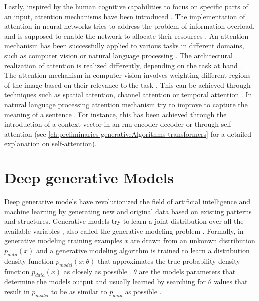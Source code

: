 Lastly, inspired by the human cognitive capabilities to focus on specific parts of an input, attention mechanisms have been introduced \cite{niu2021ReviewAttentionMechanism, aggarwal2018NeuralNetworksDeep}.
The implementation of attention in neural networks tries to address the problem of information overload, and is supposed to enable the network to allocate their resources \cite{niu2021ReviewAttentionMechanism}.
An attention mechanism has been successfully applied to various tasks in different domains, such as computer vision or natural language processing \cite{niu2021ReviewAttentionMechanism}.
The architectural realization of attention is realized differently, depending on the task at hand \cite{aggarwal2018NeuralNetworksDeep}.
The attention mechanism in computer vision involves weighting different regions of the image based on their relevance to the task \cite{aggarwal2018NeuralNetworksDeep}. 
This can be achieved through techniques such as spatial attention, channel attention or temporal attention \cite{guo2022AttentionMechanismsComputer}.
In natural language processing attention mechanism try to improve to capture the meaning of a sentence \cite{niu2021ReviewAttentionMechanism}. 
For instance, this has been achieved through the introduction of a context vector in an \gls{rnn} encoder-decoder \cite{DBLP:journals/corr/BahdanauCB14} or through self-attention \cite{vaswani2017AttentionAllYou} (see \autoref{ch:preliminaries-generativeAlgorithms-transformers} for a detailed explanation on self-attention).


\section{Deep generative Models}
\label{ch:preliminaries-generativeMlgorithms}

Deep generative \glspl{model} have revolutionized the field of artificial intelligence and machine learning by generating new and original data based on existing patterns and structures. 
Generative models try to learn a joint distribution over all the available variables \cite{kingma2019IntroductionVariationalAutoencoders}, also called the generative modeling problem \cite{goodfellow2020GenerativeAdversarialNetworks}.
Formally, in generative modeling training examples $x$ are drawn from an unkonwn distribution $p_{data}(x)$ and a generative modeling algorithm is trained to learn a distribution density function $p_{model}(x;\theta)$ that approximates the true probability density function $p_{data}(x)$ as closely as possible \cite[p. 139]{goodfellow2020GenerativeAdversarialNetworks}.
$\theta$ are the models parameters that determine the models output and usually learned by searching for $\theta$ values that result in $p_{model}$ to be as similar to $p_{data}$ as possible \cite[p. 139]{goodfellow2020GenerativeAdversarialNetworks}.

